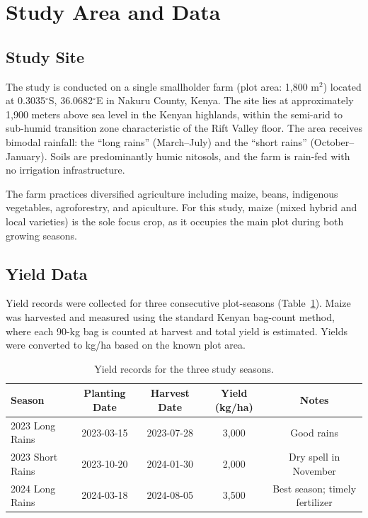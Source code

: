 \documentclass[11pt,a4paper]{article}
\begin{document}
\section{Study Area and Data}

\subsection{Study Site}

The study is conducted on a single smallholder farm (plot area: 1,800 m$^2$) located at 0.3035$^\circ$S, 36.0682$^\circ$E in Nakuru County, Kenya. The site lies at approximately 1,900 meters above sea level in the Kenyan highlands, within the semi-arid to sub-humid transition zone characteristic of the Rift Valley floor. The area receives bimodal rainfall: the ``long rains'' (March--July) and the ``short rains'' (October--January). Soils are predominantly humic nitosols, and the farm is rain-fed with no irrigation infrastructure.

The farm practices diversified agriculture including maize, beans, indigenous vegetables, agroforestry, and apiculture. For this study, maize (mixed hybrid and local varieties) is the sole focus crop, as it occupies the main plot during both growing seasons.

\subsection{Yield Data}

Yield records were collected for three consecutive plot-seasons (Table~\ref{tab:yield}). Maize was harvested and measured using the standard Kenyan bag-count method, where each 90-kg bag is counted at harvest and total yield is estimated. Yields were converted to kg/ha based on the known plot area.

\begin{table}[htbp]
\centering
\caption{Yield records for the three study seasons.}
\label{tab:yield}
\begin{tabular}{lcccc}
\toprule
\textbf{Season} & \textbf{Planting Date} & \textbf{Harvest Date} & \textbf{Yield (kg/ha)} & \textbf{Notes} \\
\midrule
2023 Long Rains & 2023-03-15 & 2023-07-28 & 3,000 & Good rains \\
2023 Short Rains & 2023-10-20 & 2024-01-30 & 2,000 & Dry spell in November \\
2024 Long Rains & 2024-03-18 & 2024-08-05 & 3,500 & Best season; timely fertilizer \\
\bottomrule
\end{tabular}
\end{table}
\end{document}
